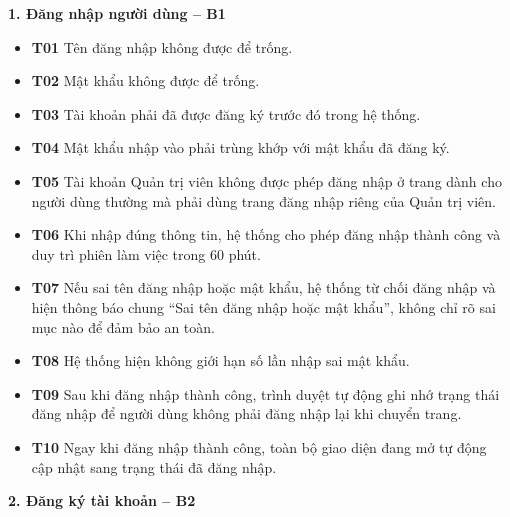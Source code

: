\documentclass[11pt,a4paper]{article}
\begin{document}
\noindent\textbf{1. Đăng nhập người dùng -- B1}
\begin{itemize}[leftmargin=0.9cm, label=$\bullet$, itemsep=2pt, topsep=4pt]
    \item \textbf{T01} Tên đăng nhập không được để trống.
    \item \textbf{T02} Mật khẩu không được để trống.
    \item \textbf{T03} Tài khoản phải đã được đăng ký trước đó trong hệ thống.
    \item \textbf{T04} Mật khẩu nhập vào phải trùng khớp với mật khẩu đã đăng ký.
    \item \textbf{T05} Tài khoản Quản trị viên không được phép đăng nhập ở trang dành cho người dùng thường mà phải dùng trang đăng nhập riêng của Quản trị viên.
    \item \textbf{T06} Khi nhập đúng thông tin, hệ thống cho phép đăng nhập thành công và duy trì phiên làm việc trong 60 phút.
    \item \textbf{T07} Nếu sai tên đăng nhập hoặc mật khẩu, hệ thống từ chối đăng nhập và hiện thông báo chung ``Sai tên đăng nhập hoặc mật khẩu'', không chỉ rõ sai mục nào để đảm bảo an toàn.
    \item \textbf{T08} Hệ thống hiện không giới hạn số lần nhập sai mật khẩu.
    \item \textbf{T09} Sau khi đăng nhập thành công, trình duyệt tự động ghi nhớ trạng thái đăng nhập để người dùng không phải đăng nhập lại khi chuyển trang.
    \item \textbf{T10} Ngay khi đăng nhập thành công, toàn bộ giao diện đang mở tự động cập nhật sang trạng thái đã đăng nhập.
\end{itemize}
\smallskip
\noindent\textbf{2. Đăng ký tài khoản -- B2}
\end{document}
